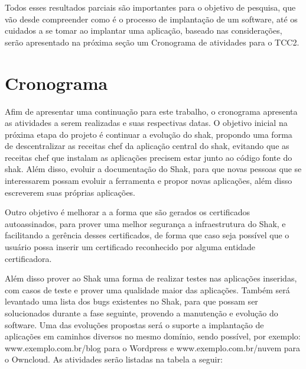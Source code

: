 Todos esses resultados parciais são importantes para o objetivo de pesquisa, que vão
desde compreender como é o processo de implantação de um software, até os cuidados
a se tomar ao implantar uma aplicação, baseado nas considerações, serão apresentado
na próxima seção um Cronograma de atividades para o TCC2.


\section{Cronograma}
%

Afim de apresentar uma continuação para este trabalho, o cronograma apresenta as
atividades a serem realizadas e suas respectivas datas.
O objetivo inicial na próxima etapa do projeto é continuar a evolução do shak,
propondo uma forma de descentralizar as receitas chef da aplicação central do shak,
evitando que as receitas chef que instalam as aplicações precisem estar junto ao
código fonte do shak. Além disso, evoluir a documentação do Shak, para que novas
pessoas que se interessarem possam evoluir a ferramenta e propor novas aplicações,
além disso escreverem suas próprias aplicações.

Outro objetivo é melhorar a a forma que são gerados os certificados autoassinados,
para prover uma melhor segurança a infraestrutura do Shak, e facilitando a gerência
desses certificados, de forma que caso seja possível que o usuário possa inserir um certificado
reconhecido por alguma entidade certificadora.

Além disso prover ao Shak uma forma de realizar testes nas aplicações inseridas,
com casos de teste e prover uma qualidade maior das aplicações. Também será levantado
uma lista dos bugs existentes no Shak, para que possam ser solucionados durante
a fase seguinte, provendo a manutenção e evolução do software. Uma das evoluções
propostas será o suporte a implantação de aplicações em caminhos diversos no mesmo
domínio, sendo possível, por exemplo: www.exemplo.com.br/blog para o Wordpress e
www.exemplo.com.br/nuvem para o Owncloud. As atividades serão listadas na tabela
a seguir:

